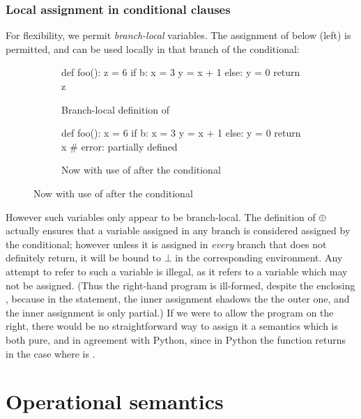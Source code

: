 \documentclass{scrartcl}
\begin{document}
\subsubsection{Local assignment in conditional clauses}

For flexibility, we permit \emph{branch-local} variables. The assignment of  below (left) is
permitted, and can be used locally in that branch of the conditional:

\begin{figure}[H]
\centering
\begin{subfigure}{0.48\textwidth}
\centering
\begin{python}
def foo():
  z = 6
  if b:
    x = 3
    y = x + 1
  else:
    y = 0
  return z
\end{python}
\caption{Branch-local definition of }
\end{subfigure}
\hfill
\begin{subfigure}{0.48\textwidth}
\centering
\begin{python}
def foo():
  x = 6
  if b:
    x = 3
    y = x + 1
  else:
    y = 0
  return x # error: partially defined
\end{python}
\caption{Now with use of  after the conditional}
\end{subfigure}
\end{figure}

\noindent However such variables only appear to be branch-local. The definition of $\merge$ actually ensures
that a variable assigned in any branch is considered assigned by the conditional; however unless it is
assigned in \emph{every} branch that does not definitely return, it will be bound to $\bot$ in the
corresponding environment. Any attempt to refer to such a variable is illegal, as it refers to a variable
which may not be assigned. (Thus the right-hand program is ill-formed, despite the enclosing ,
because in the  statement, the inner assignment shadows the the outer one, and the inner
assignment is only partial.) If we were to allow the program on the right, there would be no straightforward
way to assign it a semantics which is both pure, and in agreement with Python, since in Python the function
returns  in the case where  is .

\section{Operational semantics}
\end{document}
